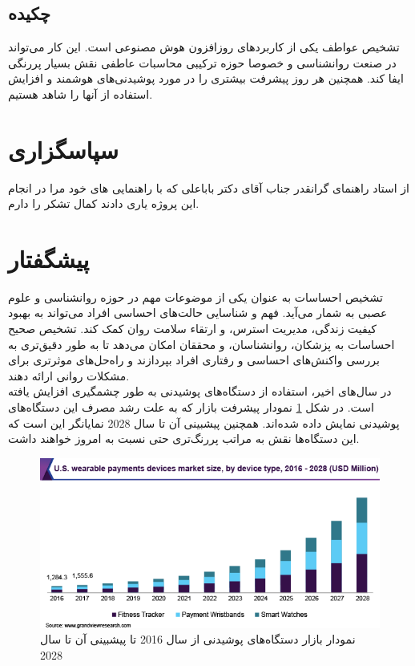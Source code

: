 \documentclass[12pt]{report}
\begin{document}
	\newpage
	\pagestyle{plain}
	\setcounter{page}{1}
	
	\chapter*{}
	
	\section*{چکیده}
		تشخیص عواطف یکی از کاربردهای روزافزون هوش مصنوعی است. این کار می‌تواند در صنعت روانشناسی و خصوصا حوزه ترکیبی محاسبات عاطفی نقش بسیار پررنگی ایفا کند. همچنین هر روز پیشرفت بیشتری را در مورد پوشیدنی‌های هوشمند و افزایش استفاده از آنها را شاهد هستیم.
	\chapter*{سپاسگزاری}
	از استاد راهنمای گرانقدر جناب آقای دکتر باباعلی  که با راهنمایی های خود مرا در انجام این
	پروژه یاری دادند کمال تشکر را دارم. 
	
	\chapter*{پیشگفتار}
	تشخیص احساسات به عنوان یکی از موضوعات مهم در حوزه روانشناسی و علوم عصبی به شمار می‌آید. فهم و شناسایی حالت‌های احساسی افراد می‌تواند به بهبود کیفیت زندگی، مدیریت استرس، و ارتقاء سلامت روان کمک کند. تشخیص صحیح احساسات به پزشکان، روانشناسان، و محققان امکان می‌دهد تا به طور دقیق‌تری به بررسی واکنش‌های احساسی و رفتاری افراد بپردازند و راه‌حل‌های موثرتری برای مشکلات روانی ارائه دهند.\\
	
	در سال‌های اخیر، استفاده از دستگاه‌های پوشیدنی به طور چشمگیری افزایش یافته است. در شکل \ref{wearables} نمودار پیشرفت بازار که به علت رشد مصرف این دستگاه‌های پوشیدنی نمایش داده شده‌اند. همچنین پیشبینی آن تا سال 2028 نمایانگر این است که این دستگاه‌ها نقش به مراتب پررنگ‌تری حتی نسبت به امروز خواهند داشت. \\
	
	\begin{figure}[h]
		\includegraphics[width=\textwidth]{devices-market.png}
		\caption{نمودار بازار دستگاه‌های پوشیدنی از سال 2016 تا پیشبینی آن تا سال 2028\cite{markets}}
		\label{wearables}
	\end{figure}
	
\end{document}
